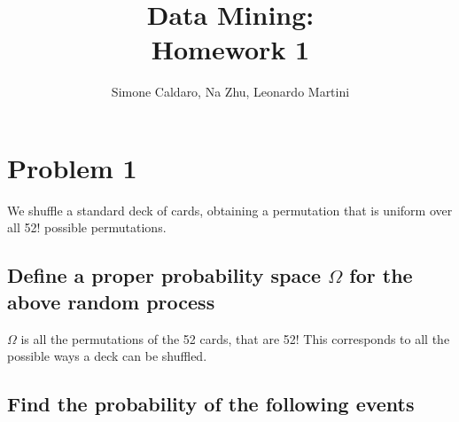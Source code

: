 \documentclass[oneside]{article}			%
\begin{document}
	\title{Data Mining:\\Homework 1}
	\author{Simone Caldaro, Na Zhu, Leonardo Martini}

	\maketitle

	\pagestyle{plain}
	\tableofcontents		%
	\clearpage				%



	\section*{Problem 1}We shuffle a standard deck of cards, obtaining a permutation that is uniform over all 52! possible permutations.
	\subsection{Define a proper probability space $\Omega$ for the above random process}
	 	$\Omega$  is all the permutations of the 52 cards, that are 52! \newline
		 This corresponds to all the possible ways a deck can be shuffled.

	\subsection{Find the probability of the following events}
\end{document}
